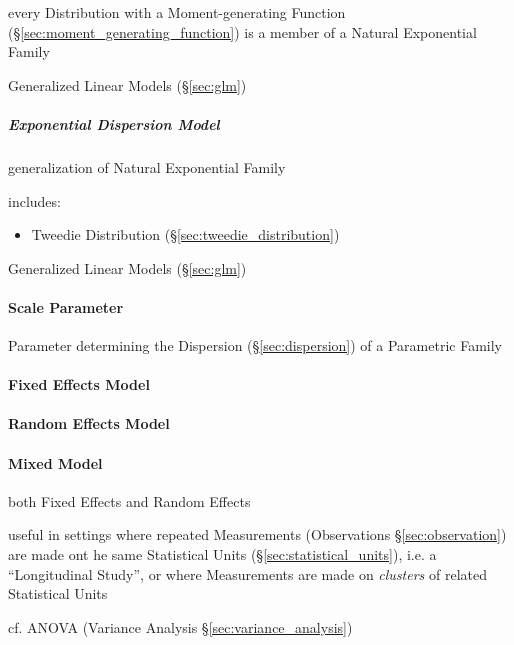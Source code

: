 every Distribution with a Moment-generating Function
(\S\ref{sec:moment_generating_function}) is a member of a Natural
Exponential Family

Generalized Linear Models (\S\ref{sec:glm})



\subparagraph{Exponential Dispersion Model}
\label{sec:exponential_dispersion}\hfill

generalization of Natural Exponential Family

includes:
\begin{itemize}
  \item Tweedie Distribution (\S\ref{sec:tweedie_distribution})
\end{itemize}

Generalized Linear Models (\S\ref{sec:glm})



\paragraph{Scale Parameter}\label{sec:scale_parameter}\hfill

Parameter determining the Dispersion (\S\ref{sec:dispersion}) of a Parametric
Family



\paragraph{Fixed Effects Model}\label{sec:fixed_effect}\hfill

\paragraph{Random Effects Model}\label{sec:random_effect}\hfill

\paragraph{Mixed Model}\label{sec:mixed_model}\hfill

both Fixed Effects and Random Effects

useful in settings where repeated Measurements (Observations
\S\ref{sec:observation}) are made ont he same Statistical Units
(\S\ref{sec:statistical_units}), i.e. a ``Longitudinal Study'', or where
Measurements are made on \emph{clusters} of related Statistical Units

cf. ANOVA (Variance Analysis \S\ref{sec:variance_analysis})

